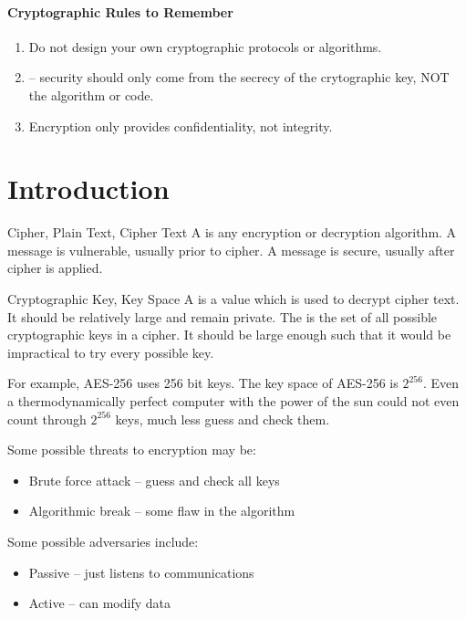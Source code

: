 \documentclass[12pt]{report}
\begin{document}
\paragraph{Cryptographic Rules to Remember}
\begin{enumerate}[noitemsep]
    \item Do not design your own cryptographic protocols or algorithms.
    \item {} -- security should only come from the secrecy of the crytographic key, NOT the algorithm or code.
    \item Encryption only provides confidentiality, not integrity.
\end{enumerate}

\section{Introduction}

\begin{dfnbox}{Cipher, Plain Text, Cipher Text}{}
    A  is any encryption or decryption algorithm. A  message is vulnerable, usually prior to cipher. A  message is secure, usually after cipher is applied.
\end{dfnbox}

\begin{dfnbox}{Cryptographic Key, Key Space}{}
    A  is a value which is used to decrypt cipher text. It should be relatively large and remain private. The  is the set of all possible cryptographic keys in a cipher. It should be large enough such that it would be impractical to try every possible key.
\end{dfnbox}

 For example, AES-256 uses 256 bit keys. The key space of AES-256 is $2^{256}$. Even a thermodynamically perfect computer with the power of the sun could not even count through $2^{256}$ keys, much less guess and check them.

Some possible threats to encryption may be:
\begin{itemize}[noitemsep]
    \item Brute force attack -- guess and check all keys
    \item Algorithmic break -- some flaw in the algorithm
\end{itemize}

Some possible adversaries include:
\begin{itemize}[noitemsep]
    \item Passive -- just listens to communications
    \item Active -- can modify data
\end{itemize}
\end{document}
